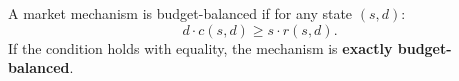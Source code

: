 \documentclass[12pt, notitlepage]{article}
\begin{document}
\begin{axiom} \label{BB} 
A market mechanism is budget-balanced if for any state $(s,d)$:
\begin{equation}
    d \cdot c(s,d) \ge s \cdot r(s,d).
\end{equation}
If the condition holds with equality, the mechanism is \textbf{exactly budget-balanced}.
\end{axiom}

\end{document}
